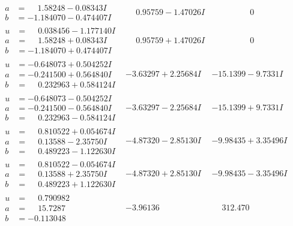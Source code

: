 \documentclass[1p]{elsarticle_modified}
\theoremstyle{definition}
\begin{document}
$$\begin{array}{c|c|c}
\begin{aligned}
a &= \phantom{-}1.58248 - 0.08343 I \\
b &= -1.184070 - 0.474407 I\end{aligned}
 & \phantom{-}0.95759 - 1.47026 I & \phantom{-0.000000 } 0 \\ \hline\begin{aligned}
u &= \phantom{-}0.038456 - 1.177140 I \\
a &= \phantom{-}1.58248 + 0.08343 I \\
b &= -1.184070 + 0.474407 I\end{aligned}
 & \phantom{-}0.95759 + 1.47026 I & \phantom{-0.000000 } 0 \\ \hline\begin{aligned}
u &= -0.648073 + 0.504252 I \\
a &= -0.241500 + 0.564840 I \\
b &= \phantom{-}0.232963 + 0.584124 I\end{aligned}
 & -3.63297 + 2.25684 I & -15.1399 - 9.7331 I \\ \hline\begin{aligned}
u &= -0.648073 - 0.504252 I \\
a &= -0.241500 - 0.564840 I \\
b &= \phantom{-}0.232963 - 0.584124 I\end{aligned}
 & -3.63297 - 2.25684 I & -15.1399 + 9.7331 I \\ \hline\begin{aligned}
u &= \phantom{-}0.810522 + 0.054674 I \\
a &= \phantom{-}0.13588 - 2.35750 I \\
b &= \phantom{-}0.489223 - 1.122630 I\end{aligned}
 & -4.87320 - 2.85130 I & -9.98435 + 3.35496 I \\ \hline\begin{aligned}
u &= \phantom{-}0.810522 - 0.054674 I \\
a &= \phantom{-}0.13588 + 2.35750 I \\
b &= \phantom{-}0.489223 + 1.122630 I\end{aligned}
 & -4.87320 + 2.85130 I & -9.98435 - 3.35496 I \\ \hline\begin{aligned}
u &= \phantom{-}0.790982\phantom{ +0.000000I} \\
a &= \phantom{-}15.7287\phantom{ +0.000000I} \\
b &= -0.113048\phantom{ +0.000000I}\end{aligned}
 & -3.96136\phantom{ +0.000000I} & \phantom{-}312.470\phantom{ +0.000000I} \\ \hline\begin{aligned}

\end{aligned}
\end{array}$$
\end{document}
